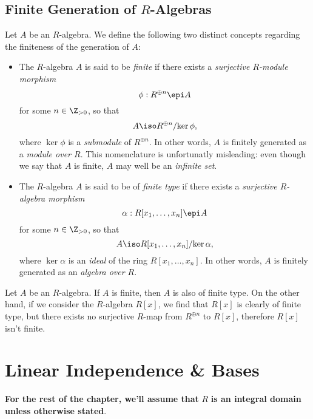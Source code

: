 \subsection{Finite Generation of \texorpdfstring{\(R\)}{R}-Algebras}

\begin{definition}
\label{def:finite-generation-algebras}
Let \(A\) be an \(R\)-algebra. We define the following two distinct concepts
regarding the finiteness of the generation of \(A\):
\begin{itemize}[(a)]\setlength\itemsep{0em}
\item The \(R\)-algebra \(A\) is said to be \emph{finite} if there exists a
  \emph{surjective \(R\)-module morphism}
  \[
  \phi: R^{\oplus n} \epi A
  \]
  for some \(n \in \Z_{>0}\), so that
  \[
  A \iso R^{\oplus n}/{\ker \phi},
  \]
  where \(\ker \phi\) is a \emph{submodule} of \(R^{\oplus n}\). In other words,
  \(A\) is finitely generated as a \emph{module over \(R\)}. This nomenclature
  is unfortunatly misleading: even though we say that \(A\) is finite, \(A\) may
  well be an \emph{infinite set}.

\item The \(R\)-algebra \(A\) is said to be of \emph{finite type} if there
  exists a \emph{surjective \(R\)-algebra morphism}
  \[
  \alpha: R[x_1, \dots, x_n] \epi A
  \]
  for some \(n \in \Z_{>0}\), so that
  \[
  A \iso R[x_1, \dots, x_n]/{\ker \alpha},
  \]
  where \(\ker \alpha\) is an \emph{ideal} of the ring \(R[x_1, \dots,
  x_n]\). In other words, \(A\) is finitely generated as an \emph{algebra over
    \(R\)}.
\end{itemize}
\end{definition}

\begin{remark}
\label{rem:finite-type-not-finite}
Let \(A\) be an \(R\)-algebra. If \(A\) is finite, then \(A\) is also of finite
type. On the other hand, if we consider the \(R\)-algebra \(R[x]\), we find that
\(R[x]\) is clearly of finite type, but there exists no surjective \(R\)-map
from \(R^{\oplus n}\) to \(R[x]\), therefore \(R[x]\) isn't finite.
\end{remark}

\section{Linear Independence \& Bases}

\begin{remark}[Important]
\label{rem:important-remark-integral-domain}
\textbf{For the rest of the chapter, we'll assume that} \(R\) \textbf{is an
  integral domain unless otherwise stated}.
\end{remark}


